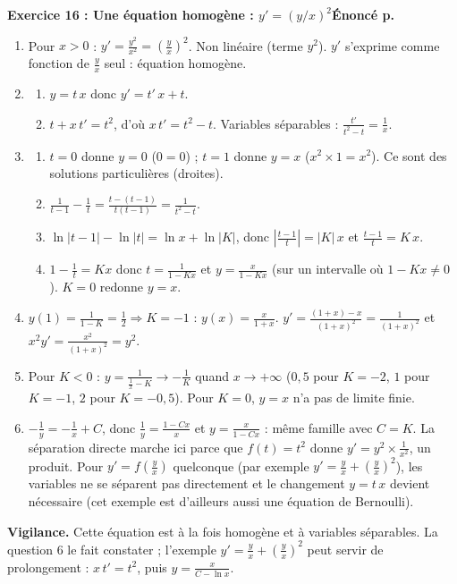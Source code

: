 \documentclass[a4paper,11pt]{article}
\newcommand{\cor}[2]{\needspace{8\baselineskip}\vspace{8pt}%
\begin{tcolorbox}[colback=uimmlightblue, colframe=uimmblue, boxrule=0.8pt, arc=2pt, left=6pt, right=6pt, top=3pt, bottom=3pt]
{\color{uimmblue}\bfseries Exercice #1 : #2}\hfill{\small\color{uimmred}\bfseries Énoncé p.~\pageref*{E-exo:#1}}
\end{tcolorbox}}
\newcommand{\vig}[1]{\par{\small\color{uimmred}\textbf{Vigilance.} #1}\par}
\newcommand{\res}[1]{\colorbox{uimmlightblue}{$\displaystyle #1$}}
\begin{document}
\cor{16}{Une équation homogène : $y' = (y/x)^2$}
\begin{enumerate}
\item Pour $x > 0$ : $y' = \frac{y^2}{x^2} = \left(\frac yx\right)^2$. Non linéaire (terme $y^2$). $y'$ s'exprime comme fonction de $\frac yx$ seul : équation homogène.
\item
\begin{enumerate}
\item $y = t\,x$ donc $y' = t'\,x + t$.
\item $t + x\,t' = t^2$, d'où \res{x\,t' = t^2 - t}. Variables séparables : $\frac{t'}{t^2 - t} = \frac1x$.
\end{enumerate}
\item
\begin{enumerate}
\item $t = 0$ donne $y = 0$ ($0 = 0$) ; $t = 1$ donne $y = x$ ($x^2 \times 1 = x^2$). Ce sont des solutions particulières (droites).
\item $\frac{1}{t-1} - \frac1t = \frac{t - (t - 1)}{t(t-1)} = \frac{1}{t^2 - t}$.
\item $\ln|t - 1| - \ln|t| = \ln x + \ln|K|$, donc $\left|\frac{t-1}{t}\right| = |K|\,x$ et $\frac{t-1}{t} = K\,x$.
\item $1 - \frac1t = Kx$ donc $t = \frac{1}{1 - Kx}$ et \res{y = \frac{x}{1 - Kx}} (sur un intervalle où $1 - Kx \neq 0$). $K = 0$ redonne $y = x$.
\end{enumerate}
\item $y(1) = \frac{1}{1 - K} = \frac12 \Rightarrow K = -1$ : \res{y(x) = \frac{x}{1 + x}}. $y' = \frac{(1 + x) - x}{(1 + x)^2} = \frac{1}{(1 + x)^2}$ et $x^2 y' = \frac{x^2}{(1 + x)^2} = y^2$.
\item Pour $K < 0$ : $y = \frac{1}{\frac1x - K} \to -\frac1K$ quand $x \to +\infty$ ($0{,}5$ pour $K = -2$, $1$ pour $K = -1$, $2$ pour $K = -0{,}5$). Pour $K = 0$, $y = x$ n'a pas de limite finie.
\item $-\frac1y = -\frac1x + C$, donc $\frac1y = \frac{1 - Cx}{x}$ et $y = \frac{x}{1 - Cx}$ : même famille avec $C = K$. La séparation directe marche ici parce que $f(t) = t^2$ donne $y' = y^2 \times \frac{1}{x^2}$, un produit. Pour $y' = f\!\left(\frac yx\right)$ quelconque (par exemple $y' = \frac yx + \left(\frac yx\right)^2$), les variables ne se séparent pas directement et le changement $y = t\,x$ devient nécessaire (cet exemple est d'ailleurs aussi une équation de Bernoulli).
\end{enumerate}
\vig{Cette équation est à la fois homogène et à variables séparables. La question 6 le fait constater ; l'exemple $y' = \frac yx + \left(\frac yx\right)^2$ peut servir de prolongement : $x\,t' = t^2$, puis $y = \frac{x}{C - \ln x}$.}
\end{document}
